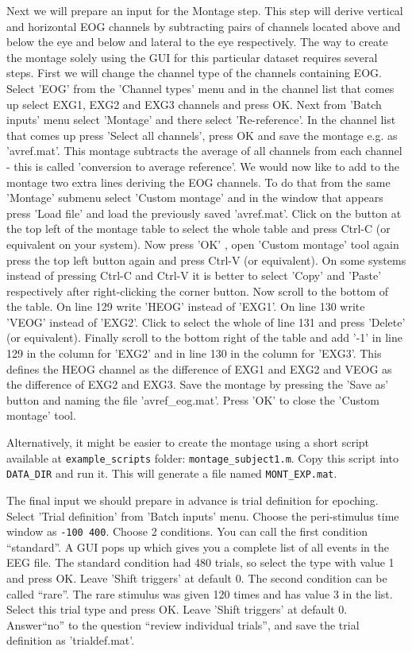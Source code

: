 Next we will prepare an input for the Montage step. This step will derive vertical and horizontal EOG channels by subtracting pairs of channels located above and below the eye and below and lateral to the eye respectively. The way to create the montage solely using the GUI for this particular dataset requires several steps. First we will change the channel type of the channels containing EOG. Select  'EOG' from the 'Channel types' menu and in the channel list that comes up select EXG1, EXG2 and EXG3 channels and press OK. Next  from 'Batch inputs' menu select 'Montage' and there select 'Re-reference'. In the channel list that comes up press 'Select all channels', press OK and save the montage e.g. as 'avref.mat'. This montage subtracts the average of all channels from each channel - this is called 'conversion to average reference'. We would now like to add to the montage two extra lines deriving the EOG channels. To do that from the same 'Montage' submenu select 'Custom montage' and in the window that appears press 'Load file' and load the previously saved 'avref.mat'.  Click on the button at the top left of the montage table to select the whole table and press Ctrl-C (or equivalent on your system). Now press 'OK' , open 'Custom montage' tool again press the top left button again and press Ctrl-V (or equivalent). On some systems instead of pressing Ctrl-C and Ctrl-V it is better to select 'Copy' and 'Paste' respectively after right-clicking the corner button.   Now scroll to the bottom of the table. On line 129 write 'HEOG' instead of 'EXG1'. On line 130 write 'VEOG' instead of 'EXG2'. Click to select the whole of line 131 and press 'Delete' (or equivalent). Finally scroll to the bottom right of the table and  add '-1' in line 129 in the column for 'EXG2' and in line 130 in the column for 'EXG3'. This defines the HEOG channel as the difference of EXG1 and EXG2 and VEOG as the difference of EXG2 and EXG3. Save the montage by  pressing the 'Save as' button and naming the file 'avref\_eog.mat'. Press 'OK' to close the 'Custom montage' tool.

Alternatively, it might be easier to create the montage using a short script available at  \texttt{example\_scripts} folder: \texttt{montage\_subject1.m}. Copy this script into \texttt{DATA\_DIR} and run it. This will generate a file named \texttt{MONT\_EXP.mat}.

The final input we should prepare in advance is trial definition for epoching. Select 'Trial definition' from 'Batch inputs' menu.  Choose the peri-stimulus time window as \texttt{-100 400}. Choose 2 conditions. You can call the first condition ``standard''. A GUI pops up which gives you a complete list of all events in the EEG file. The standard condition had 480 trials, so select the type with value 1 and press OK. Leave 'Shift triggers' at default 0. The second condition can be called ``rare''. The rare stimulus was given 120 times and has value 3 in the list. Select this trial type and press OK.  Leave 'Shift triggers' at default 0.  Answer``no'' to the question  ``review individual trials'', and  save the trial definition as 'trialdef.mat'. 

